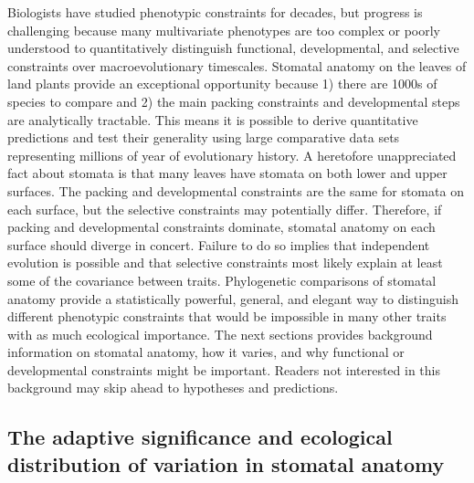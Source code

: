 \documentclass[
  12pt,
]{article}
\begin{document}
Biologists have studied phenotypic constraints for decades, but progress is challenging because many multivariate phenotypes are too complex or poorly understood to quantitatively distinguish functional, developmental, and selective constraints over macroevolutionary timescales. Stomatal anatomy on the leaves of land plants provide an exceptional opportunity because 1) there are 1000s of species to compare and 2) the main packing constraints and developmental steps are analytically tractable. This means it is possible to derive quantitative predictions and test their generality using large comparative data sets representing millions of year of evolutionary history. A heretofore unappreciated fact about stomata is that many leaves have stomata on both lower and upper surfaces. The packing and developmental constraints are the same for stomata on each surface, but the selective constraints may potentially differ. Therefore, if packing and developmental constraints dominate, stomatal anatomy on each surface should diverge in concert. Failure to do so implies that independent evolution is possible and that selective constraints most likely explain at least some of the covariance between traits. Phylogenetic comparisons of stomatal anatomy provide a statistically powerful, general, and elegant way to distinguish different phenotypic constraints that would be impossible in many other traits with as much ecological importance. The next sections provides background information on stomatal anatomy, how it varies, and why functional or developmental constraints might be important. Readers not interested in this background may skip ahead to hypotheses and predictions.

\hypertarget{the-adaptive-significance-and-ecological-distribution-of-variation-in-stomatal-anatomy}{%
\subsection{The adaptive significance and ecological distribution of variation in stomatal anatomy}\label{the-adaptive-significance-and-ecological-distribution-of-variation-in-stomatal-anatomy}}
\end{document}
